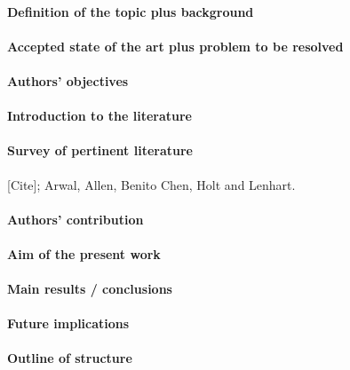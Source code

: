 \paragraph{Definition of the topic plus background}
\paragraph{Accepted state of the art plus problem to be resolved}
\paragraph{Authors’ objectives}
\paragraph{Introduction to the literature}
%
\paragraph{Survey of pertinent literature}
    [Cite];
    Arwal, Allen, Benito Chen, Holt and Lenhart.
    
\paragraph{Authors’ contribution}
\paragraph{Aim of the present work}
\paragraph{Main results / conclusions}
%
\paragraph{Future implications}
\paragraph{Outline of structure}